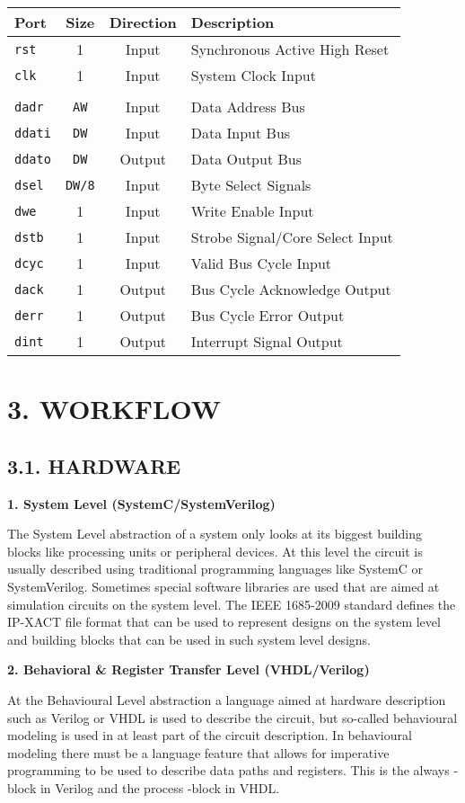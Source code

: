 \documentclass[]{article}
\begin{document}
\begin{longtable}[]{@{}lccl@{}}
\toprule
Port & Size & Direction & Description\tabularnewline
\midrule
\endhead
\texttt{rst} & 1 & Input & Synchronous Active High Reset\tabularnewline
\texttt{clk} & 1 & Input & System Clock Input\tabularnewline
& & &\tabularnewline
\texttt{dadr} & \texttt{AW} & Input & Data Address Bus\tabularnewline
\texttt{ddati} & \texttt{DW} & Input & Data Input Bus\tabularnewline
\texttt{ddato} & \texttt{DW} & Output & Data Output Bus\tabularnewline
\texttt{dsel} & \texttt{DW/8} & Input & Byte Select
Signals\tabularnewline
\texttt{dwe} & 1 & Input & Write Enable Input\tabularnewline
\texttt{dstb} & 1 & Input & Strobe Signal/Core Select
Input\tabularnewline
\texttt{dcyc} & 1 & Input & Valid Bus Cycle Input\tabularnewline
\texttt{dack} & 1 & Output & Bus Cycle Acknowledge Output\tabularnewline
\texttt{derr} & 1 & Output & Bus Cycle Error Output\tabularnewline
\texttt{dint} & 1 & Output & Interrupt Signal Output\tabularnewline
\bottomrule
\end{longtable}

\hypertarget{workflow}{%
\section{3. WORKFLOW}\label{workflow}}

\hypertarget{hardware}{%
\subsection{3.1. HARDWARE}\label{hardware}}

\textbf{1. System Level (SystemC/SystemVerilog)}

The System Level abstraction of a system only looks at its biggest
building blocks like processing units or peripheral devices. At this
level the circuit is usually described using traditional programming
languages like SystemC or SystemVerilog. Sometimes special software
libraries are used that are aimed at simulation circuits on the system
level. The IEEE 1685-2009 standard defines the IP-XACT file format that
can be used to represent designs on the system level and building blocks
that can be used in such system level designs.

\textbf{2. Behavioral \& Register Transfer Level (VHDL/Verilog)}

At the Behavioural Level abstraction a language aimed at hardware
description such as Verilog or VHDL is used to describe the circuit, but
so-called behavioural modeling is used in at least part of the circuit
description. In behavioural modeling there must be a language feature
that allows for imperative programming to be used to describe data paths
and registers. This is the always -block in Verilog and the process
-block in VHDL.
\end{document}
